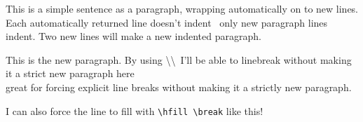 \documentclass{article}
\begin{document}
This is a simple sentence as a paragraph, wrapping automatically on to new lines. Each automatically returned line doesn't indent \textemdash \ only new paragraph lines indent. Two new lines will make a new indented paragraph.

This is the new paragraph. By using \textbackslash \textbackslash \  I'll be able to linebreak without making it a strict new paragraph here \textellipsis \\ \textellipsis great for forcing explicit line breaks without making it a strictly new paragraph.

I can also force the line to fill with \texttt{\textbackslash hfill \textbackslash break} \textellipsis \hfill \break \textellipsis like this!
\end{document}

